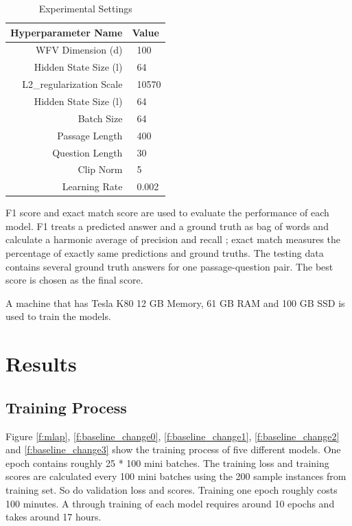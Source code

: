 \documentclass[modernstyle,12pt]{sjsuthesis}
\theoremstyle{definition}
\begin{document}
\begin{table}[htbp]\centering
  \caption{Experimental Settings}
  \label{tab:settings}
  \begin{tabular}{|r|l|} \hline
    Hyperparameter Name& Value \\ \hline\hline
    WFV Dimension (d) & \ 100 \\
    Hidden State Size (l) & \ 64 \\
    L2\_regularization Scale & \ 10570\\
    Hidden State Size (l) & \ 64\\
    Batch Size & \ 64\\
    Passage Length & \ 400\\
    Question Length & \ 30\\
    Clip Norm & \ 5\\
    Learning Rate & \ 0.002 \\ \hline
  \end{tabular}
\end{table}

F1 score and exact match score are used to evaluate the performance of each model. F1 treats a predicted answer and a ground truth as bag of words and calculate a harmonic average of precision and recall ; exact match measures the percentage of exactly same predictions and ground truths. The testing data contains several ground truth answers for one passage-question pair. The best score is chosen as the final score.

A machine that has Tesla K80 12 GB Memory, 61 GB RAM and 100 GB SSD is used to train the models.

\section{Results}
\subsection{Training Process}

Figure \ref{f:mlap}, \ref{f:baseline_change0}, \ref{f:baseline_change1}, \ref{f:baseline_change2} and \ref{f:baseline_change3} show the training process of five different models. One epoch contains roughly 25 * 100 mini batches. The training loss and training scores are calculated every 100 mini batches using the 200 sample instances from training set. So do validation loss and scores. Training one epoch roughly costs 100 minutes. A through training of each model requires around 10 epochs and takes around 17 hours.
\end{document}
